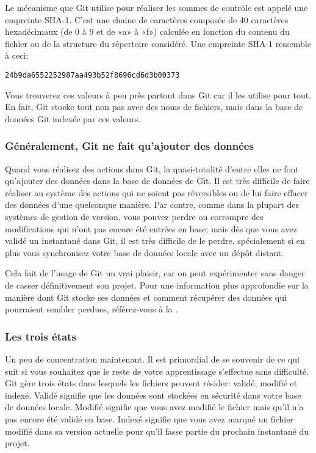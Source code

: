 Le mécanisme que Git utilise pour réaliser les sommes de contrôle est appelé une empreinte SHA-1.
C'est une chaine de caractères composée de 40 caractères hexadécimaux (de $0$ à $9$ et de «a» à «f») calculée en fonction du contenu du fichier ou de la structure du répertoire considéré.
Une empreinte SHA-1 ressemble à ceci:
\begin{Schunk}
\begin{Verbatim}
24b9da6552252987aa493b52f8696cd6d3b00373
\end{Verbatim}
\end{Schunk}

Vous trouverez ces valeurs à peu près partout dans Git car il les utilise pour tout.
En fait, Git stocke tout non pas avec des noms de fichiers, mais dans la base de données Git indexée par ces valeurs.

\subsubsection{Généralement, Git ne fait qu'ajouter des données}

Quand vous réalisez des actions dans Git, la quasi-totalité d'entre elles ne font qu'ajouter des données dans la base de données de Git.
Il est très difficile de faire réaliser au système des actions qui ne soient pas réversibles ou de lui faire effacer des données d'une quelconque manière.
Par contre, comme dans la plupart des systèmes de gestion de version, vous pouvez perdre ou corrompre des modifications qui n'ont pas encore été entrées en base;
mais dès que vous avez validé un instantané dans Git, il est très difficile de le perdre, spécialement si en plus vous synchronisez votre base de données locale avec un dépôt distant.

Cela fait de l'usage de Git un vrai plaisir, car on peut expérimenter sans danger de casser définitivement son projet.
Pour une information plus approfondie sur la manière dont Git stocke ses données et comment récupérer des données qui pourraient sembler perdues, référez-vous à la .

\subsubsection{Les trois états}

Un peu de concentration maintenant.
Il est primordial de se souvenir de ce qui suit si vous souhaitez que le reste de votre apprentissage s'effectue sans difficulté.
Git gère trois états dans lesquels les fichiers peuvent résider: validé, modifié et indexé.
Validé signifie que les données sont stockées en sécurité dans votre base de données locale.
Modifié signifie que vous avez modifié le fichier mais qu'il n'a pas encore été validé en base.
Indexé signifie que vous avez marqué un fichier modifié dans sa version actuelle pour qu'il fasse partie du prochain instantané du projet.

